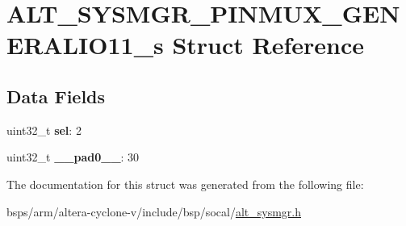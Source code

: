 \hypertarget{structALT__SYSMGR__PINMUX__GENERALIO11__s}{}\section{A\+L\+T\+\_\+\+S\+Y\+S\+M\+G\+R\+\_\+\+P\+I\+N\+M\+U\+X\+\_\+\+G\+E\+N\+E\+R\+A\+L\+I\+O11\+\_\+s Struct Reference}
\label{structALT__SYSMGR__PINMUX__GENERALIO11__s}
\subsection*{Data Fields}
\begin{DoxyCompactItemize}
\item 
\mbox{\label{structALT__SYSMGR__PINMUX__GENERALIO11__s_ae521c7330f18276c10ff5b0afd1892da}} 
uint32\+\_\+t {\bfseries sel}\+: 2
\item 
\mbox{\label{structALT__SYSMGR__PINMUX__GENERALIO11__s_aaceb67c5fc7bbc5cdf3f79a16897885c}} 
uint32\+\_\+t {\bfseries \+\_\+\+\_\+pad0\+\_\+\+\_\+}\+: 30
\end{DoxyCompactItemize}


The documentation for this struct was generated from the following file\+:\begin{DoxyCompactItemize}
\item 
bsps/arm/altera-\/cyclone-\/v/include/bsp/socal/\mbox{\hyperlink{alt__sysmgr_8h}{alt\+\_\+sysmgr.\+h}}\end{DoxyCompactItemize}
